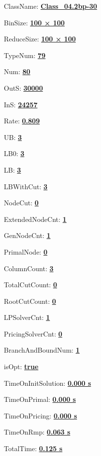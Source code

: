 \documentclass[11pt]{article}
\begin{document}
\pagestyle{empty}


ClassName: \underline{\textbf{Class_04.2bp-30}}
\par
BinSize: \underline{\textbf{100 × 100}}
\par
ReduceSize: \underline{\textbf{100 × 100}}
\par
TypeNum: \underline{\textbf{79}}
\par
Num: \underline{\textbf{80}}
\par
OutS: \underline{\textbf{30000}}
\par
InS: \underline{\textbf{24257}}
\par
Rate: \underline{\textbf{0.809}}
\par
UB: \underline{\textbf{3}}
\par
LB0: \underline{\textbf{3}}
\par
LB: \underline{\textbf{3}}
\par
LBWithCut: \underline{\textbf{3}}
\par
NodeCut: \underline{\textbf{0}}
\par
ExtendedNodeCnt: \underline{\textbf{1}}
\par
GenNodeCnt: \underline{\textbf{1}}
\par
PrimalNode: \underline{\textbf{0}}
\par
ColumnCount: \underline{\textbf{3}}
\par
TotalCutCount: \underline{\textbf{0}}
\par
RootCutCount: \underline{\textbf{0}}
\par
LPSolverCnt: \underline{\textbf{1}}
\par
PricingSolverCnt: \underline{\textbf{0}}
\par
BranchAndBoundNum: \underline{\textbf{1}}
\par
isOpt: \underline{\textbf{true}}
\par
TimeOnInitSolution: \underline{\textbf{0.000 s}}
\par
TimeOnPrimal: \underline{\textbf{0.000 s}}
\par
TimeOnPricing: \underline{\textbf{0.000 s}}
\par
TimeOnRmp: \underline{\textbf{0.063 s}}
\par
TotalTime: \underline{\textbf{0.125 s}}
\par
\newpage
\end{document}
